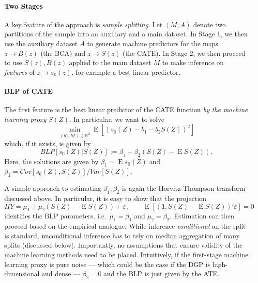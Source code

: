 \documentclass[11pt, a4paper, leqno]{article}
\DeclareMathOperator{\E}{E}
\begin{document}
\paragraph*{Two Stages}
A key feature of the approach is \textit{sample splitting}. Let $(M,A)$ denote two partitions of the sample into an auxiliary and a main dataset.
In Stage 1, we then use the auxiliary dataset $A$ to generate machine predictors for the maps $z\to B(z)$ (the BCA) and $z\to S(z)$ (the CATE).
In Stage 2, we then proceed to use $S(z), B(z)$ applied to the main dataset $M$ to make inference on \textit{features} of $z\to s_0(z)$, for example a best linear predictor.

\paragraph*{BLP of CATE}
The first feature is the best linear predictor of the CATE function \textit{by the machine learning proxy} $S(Z)$.
In particular, we want to solve
\begin{equation*}
    \min_{(b1,b2)\in \mathbb{R}^2} \E [(s_0(Z) - b_1 - b_2 S(Z))^2]
\end{equation*}
which, if it exists, is given by
\begin{equation*}
    BLP[s_0(Z)|S(Z)] := \beta_1 + \beta_2(S(Z) - \E S(Z)).
\end{equation*}
Here, the solutions are given by $\beta_1 = \E s_0(Z)$ and $\beta_2 = Cov[s_0(Z), S(Z)]/Var[S(Z)]$.

A simple approach to estimating $\beta_1, \beta_2$ is again the Horvitz-Thompson transform discussed above.
In particular, it is easy to show that the projection
\begin{equation*}
    HY = \mu_1 + \mu_2(S(Z) - \E S(Z)) + \varepsilon, \qquad \E[(1, S(Z) - \E S(Z))'\varepsilon] = 0
\end{equation*}
identifies the BLP parameters, i.e.\ $\mu_1=\beta_1$ and $\mu_2 = \beta_2$.
Estimation can then proceed based on the empirical analogue.
While inference \textit{conditional} on the split is standard, unconditional inference has to rely on median aggregation of many splits (discussed below).
Importantly, no assumptions that ensure validity of the machine learning methods need to be placed.
Intuitively, if the first-stage machine learning proxy is pure noise --- which could be the case if the DGP is high-dimensional and dense ---
$\beta_2 = 0$ and the BLP is just given by the ATE\@.
\end{document}
